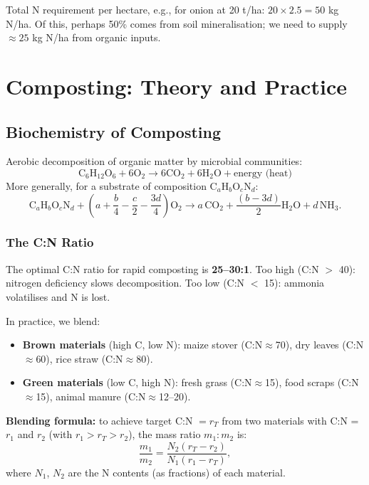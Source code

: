 \documentclass[12pt,a4paper,openany]{book}
\begin{document}
Total N requirement per hectare, e.g., for onion at 20 t/ha: $20\times2.5=50$ kg N/ha. Of this, perhaps 50\% comes from soil mineralisation; we need to supply $\approx25$ kg N/ha from organic inputs.

\chapter{Composting: Theory and Practice}
\label{chap:compost}

\section{Biochemistry of Composting}

Aerobic decomposition of organic matter by microbial communities:
\begin{equation}
  \text{C}_6\text{H}_{12}\text{O}_6 + 6\text{O}_2 \to 6\text{CO}_2 + 6\text{H}_2\text{O} + \text{energy (heat)}
\end{equation}
More generally, for a substrate of composition C$_a$H$_b$O$_c$N$_d$:
\begin{equation}
  \text{C}_a\text{H}_b\text{O}_c\text{N}_d + \left(a+\frac{b}{4}-\frac{c}{2}-\frac{3d}{4}\right)\text{O}_2 \to a\,\text{CO}_2 + \frac{(b-3d)}{2}\text{H}_2\text{O} + d\,\text{NH}_3.
\end{equation}

\subsection{The C:N Ratio}

The optimal C:N ratio for rapid composting is \textbf{25--30:1}. Too high (C:N $>$ 40): nitrogen deficiency slows decomposition. Too low (C:N $<$ 15): ammonia volatilises and N is lost.

In practice, we blend:
\begin{itemize}[leftmargin=2em]
  \item \textbf{Brown materials} (high C, low N): maize stover (C:N$\approx$70), dry leaves (C:N$\approx$60), rice straw (C:N$\approx$80).
  \item \textbf{Green materials} (low C, high N): fresh grass (C:N$\approx$15), food scraps (C:N$\approx$15), animal manure (C:N$\approx$12--20).
\end{itemize}

\textbf{Blending formula:} to achieve target C:N $= r_T$ from two materials with C:N = $r_1$ and $r_2$ (with $r_1>r_T>r_2$), the mass ratio $m_1:m_2$ is:
\begin{equation}
  \frac{m_1}{m_2} = \frac{N_2(r_T-r_2)}{N_1(r_1-r_T)},
  \label{eq:blend}
\end{equation}
where $N_1$, $N_2$ are the N contents (as fractions) of each material.
\end{document}
